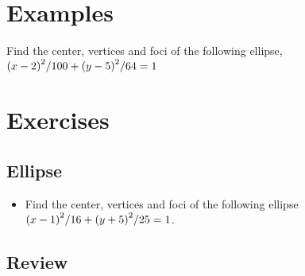 \documentclass[../main-exe.tex]{subfiles}
\begin{document}
\section{Examples}

Find the center, vertices and foci of the following ellipse, $\qty(x-2)^2/100 + \qty(y-5)^2/64 = 1$


\section{Exercises}

\subsection{Ellipse}

\begin{itemize}
    \item Find the center, vertices and foci of the following ellipse $\qty(x-1)^2/16 + \qty(y+5)^2/25 = 1$.
\end{itemize}

\subsection{Review}
\end{document}
